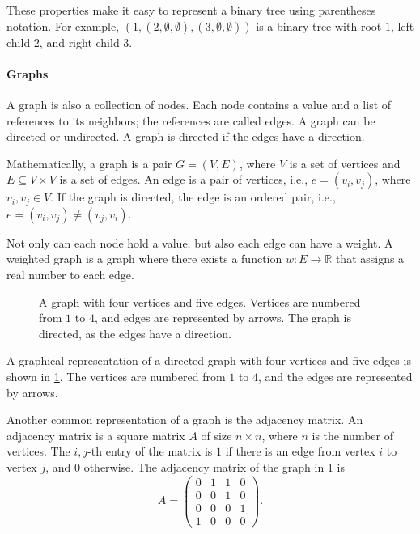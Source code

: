 These properties make it easy to represent a binary tree using parentheses notation.  For
example, $(1, (2, \emptyset, \emptyset), (3, \emptyset, \emptyset))$ is a binary tree
with root $1$, left child $2$, and right child $3$.

\paragraph{Graphs}  A graph is also a collection of nodes.  Each node contains a value and a
list of references to its neighbors; the references are called edges.  A graph can be
directed or undirected.  A graph is directed if the edges have a direction.

Mathematically, a graph is a pair $G = (V, E)$, where $V$ is a set of vertices and $E \subseteq
V \times V$ is a set of edges.  An edge is a pair of vertices, i.e., $e = (v_i, v_j)$,
where $v_i, v_j \in V$. If the graph is directed, the edge is an ordered pair, i.e., $e =
(v_i, v_j) \neq (v_j, v_i)$.

Not only can each node hold a value, but also each edge can have a weight.  A weighted
graph is a graph where there exists a function $w : E \rightarrow \mathbb{R}$ that assigns
a real number to each edge.

\begin{figure}
  \centering
  \caption{
    A graph with four vertices and five edges.  Vertices are numbered from $1$ to $4$, and
    edges are represented by arrows.  The graph is directed, as the edges have a direction.
  }
  \label{fig:graph}
\end{figure}

A graphical representation of a directed graph with four vertices and five edges is shown
in \cref{fig:graph}.  The vertices are numbered from $1$ to $4$, and the edges are
represented by arrows.

Another common representation of a graph is the adjacency matrix.  An adjacency matrix is
a square matrix $A$ of size $n \times n$, where $n$ is the number of vertices.  The
$i, j$-th entry of the matrix is $1$ if there is an edge from vertex $i$ to vertex $j$,
and $0$ otherwise.  The adjacency matrix of the graph in \cref{fig:graph} is
\[
  A = \begin{pmatrix}
    0 & 1 & 1 & 0 \\
    0 & 0 & 1 & 0 \\
    0 & 0 & 0 & 1 \\
    1 & 0 & 0 & 0
  \end{pmatrix}\text{.}
\]

